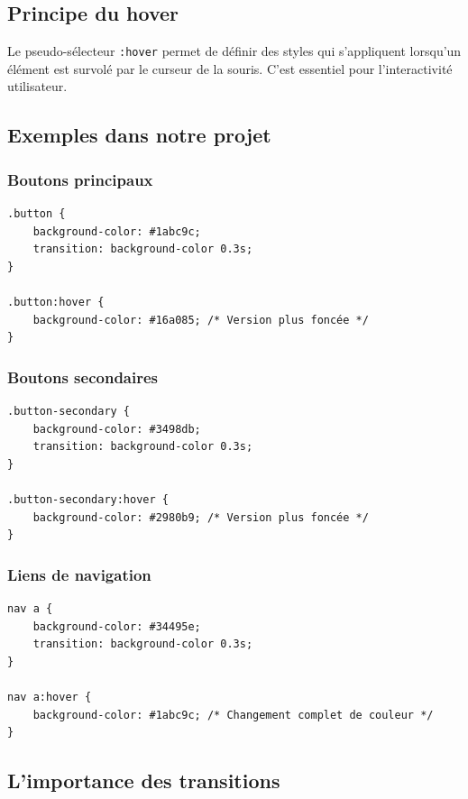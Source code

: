 \documentclass[12pt,a4paper]{article}
\begin{document}
\subsection{Principe du hover}

Le pseudo-sélecteur \texttt{:hover} permet de définir des styles qui s'appliquent lorsqu'un élément est survolé par le curseur de la souris. C'est essentiel pour l'interactivité utilisateur.

\subsection{Exemples dans notre projet}

\subsubsection{Boutons principaux}

\begin{lstlisting}[style=CSS]
.button {
    background-color: #1abc9c;
    transition: background-color 0.3s;
}

.button:hover {
    background-color: #16a085; /* Version plus foncée */
}
\end{lstlisting}

\subsubsection{Boutons secondaires}

\begin{lstlisting}[style=CSS]
.button-secondary {
    background-color: #3498db;
    transition: background-color 0.3s;
}

.button-secondary:hover {
    background-color: #2980b9; /* Version plus foncée */
}
\end{lstlisting}

\subsubsection{Liens de navigation}

\begin{lstlisting}[style=CSS]
nav a {
    background-color: #34495e;
    transition: background-color 0.3s;
}

nav a:hover {
    background-color: #1abc9c; /* Changement complet de couleur */
}
\end{lstlisting}

\subsection{L'importance des transitions}
\end{document}
